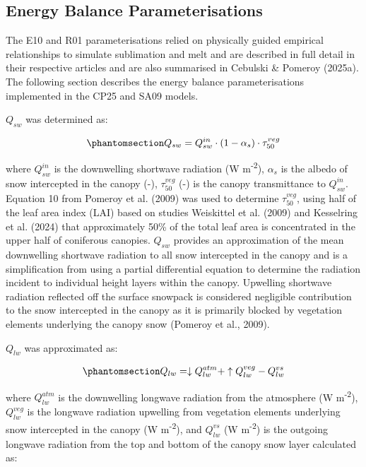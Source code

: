 \documentclass[
]{agujournal2019}
\begin{document}
\subsection{Energy Balance
Parameterisations}\label{energy-balance-parameterisations}

The E10 and R01 parameterisations relied on physically guided empirical
relationships to simulate sublimation and melt and are described in full
detail in their respective articles and are also summarised in Cebulski
\& Pomeroy (2025a). The following section describes the energy balance
parameterisations implemented in the CP25 and SA09 models.

\(Q_{sw}\) was determined as:

\begin{equation}\phantomsection\label{eq-sw}{
Q_{sw} = Q_{sw}^{in} \cdot (1 - \alpha_s) \cdot \tau_{50}^{veg}
}\end{equation}

where \(Q_{sw}^{in}\) is the downwelling shortwave radiation (W
m\textsuperscript{-2}), \(\alpha_s\) is the albedo of snow intercepted
in the canopy (-), \(\tau_{50}^{veg}\) (-) is the canopy transmittance
to \(Q_{sw}^{in}\). Equation 10 from Pomeroy et al. (2009) was used to
determine \(\tau_{50}^{veg}\), using half of the leaf area index (LAI)
based on studies Weiskittel et al. (2009) and Kesselring et al. (2024)
that approximately 50\% of the total leaf area is concentrated in the
upper half of coniferous canopies. \(Q_{sw}\) provides an approximation
of the mean downwelling shortwave radiation to all snow intercepted in
the canopy and is a simplification from using a partial differential
equation to determine the radiation incident to individual height layers
within the canopy. Upwelling shortwave radiation reflected off the
surface snowpack is considered negligible contribution to the snow
intercepted in the canopy as it is primarily blocked by vegetation
elements underlying the canopy snow (Pomeroy et al., 2009).

\(Q_{lw}\) was approximated as:

\begin{equation}\phantomsection\label{eq-lw}{
Q_{lw} = \downarrow Q_{lw}^{atm} + \uparrow Q_{lw}^{veg} - Q_{lw}^{vs}
}\end{equation}

where \(Q_{lw}^{atm}\) is the downwelling longwave radiation from the
atmosphere (W m\textsuperscript{-2}), \(Q_{lw}^{veg}\) is the longwave
radiation upwelling from vegetation elements underlying snow intercepted
in the canopy (W m\textsuperscript{-2}), and \(Q_{lw}^{vs}\) (W
m\textsuperscript{-2}) is the outgoing longwave radiation from the top
and bottom of the canopy snow layer calculated as:
\end{document}
